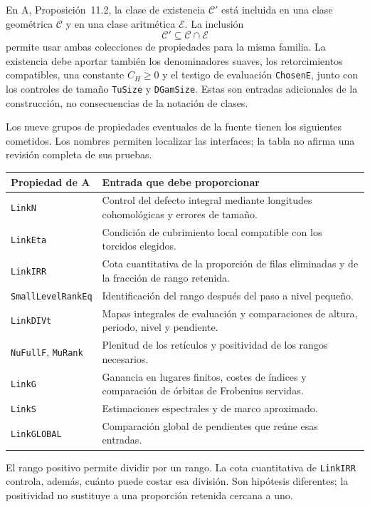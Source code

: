En A, Proposición~11.2, la clase de existencia
$\mathcal C'$ está incluida en una clase geométrica $\mathcal C$
y en una clase aritmética $\mathcal E$. La inclusión
\[
 \mathcal C'\subseteq\mathcal C\cap\mathcal E
\]
permite usar ambas colecciones de propiedades para la misma familia.
La existencia debe aportar también los denominadores suaves,
los retorcimientos compatibles, una constante $C_H\ge0$ y el
testigo de evaluación \texttt{ChosenE}, junto con los controles de
tamaño \texttt{TuSize} y \texttt{DGamSize}. Estas son entradas
adicionales de la construcción, no consecuencias de la notación
de clases.

Los nueve grupos de propiedades eventuales de la fuente tienen
los siguientes cometidos. Los nombres permiten localizar las
interfaces; la tabla no afirma una revisión completa de sus pruebas.

\begin{center}
\small
\begin{tabularx}{\textwidth}{@{}p{}Y@{}}
\toprule
\textbf{Propiedad de A} & \textbf{Entrada que debe proporcionar}\\
\midrule
\texttt{LinkN} &
Control del defecto integral mediante longitudes cohomológicas
y errores de tamaño.\\
\texttt{LinkEta} &
Condición de cubrimiento local compatible con los torcidos elegidos.\\
\texttt{LinkIRR} &
Cota cuantitativa de la proporción de filas eliminadas y de la
fracción de rango retenida.\\
\texttt{SmallLevelRankEq} &
Identificación del rango después del paso a nivel pequeño.\\
\texttt{LinkDIVt} &
Mapas integrales de evaluación y comparaciones de altura, periodo,
nivel y pendiente.\\
\texttt{NuFullF}, \texttt{MuRank} &
Plenitud de los retículos y positividad de los rangos necesarios.\\
\texttt{LinkG} &
Ganancia en lugares finitos, costes de índices y comparación de
órbitas de Frobenius servidas.\\
\texttt{LinkS} &
Estimaciones espectrales y de marco aproximado.\\
\texttt{LinkGLOBAL} &
Comparación global de pendientes que reúne esas entradas.\\
\bottomrule
\end{tabularx}
\end{center}

El rango positivo permite dividir por un rango. La cota cuantitativa
de \texttt{LinkIRR} controla, además, cuánto puede costar esa división.
Son hipótesis diferentes; la positividad no sustituye a una
proporción retenida cercana a uno.

